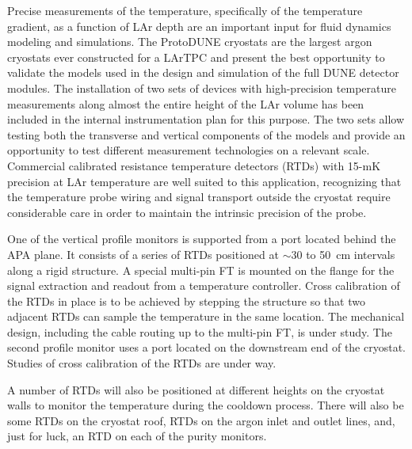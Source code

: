 	Precise %
	measurements of the temperature, specifically of the temperature gradient, %
	as a function of LAr depth are %
	an important input for fluid dynamics modeling and simulations.  The ProtoDUNE cryostats are the largest argon cryostats ever constructed for a LArTPC and present the best opportunity to validate the models used in the design and simulation of the full DUNE detector modules. The installation of two sets of devices with high-precision temperature measurements
	along almost the entire height of the LAr volume %
	has been included in the internal instrumentation plan for this purpose. The two sets allow testing both the transverse and vertical components of the models and provide an opportunity to test different measurement technologies on a relevant scale. 
	Commercial calibrated resistance temperature detectors (RTDs) with 15-mK precision at LAr temperature are well suited to this application, recognizing that the temperature probe wiring and signal transport outside the cryostat require considerable care in order to maintain %
	the intrinsic precision of the probe.
	
One of  %
the vertical profile monitors is supported from a port located behind the APA plane. It consists of a series of RTDs positioned at $\sim$30 to 50~cm intervals %
along a rigid structure. %
A special multi-pin FT is mounted on the flange %
for the signal extraction and readout from a temperature controller.  Cross calibration of the RTDs in place is to be achieved by stepping the structure so that two adjacent RTDs can sample the temperature in the same location.
The mechanical design, including the cable routing up to the multi-pin FT, is under study.
The second profile monitor uses a port located on the downstream end of the cryostat. Studies of cross calibration of the RTDs are under way. 

A number of RTDs will also be positioned at different heights %
on the cryostat walls to monitor the temperature %
during the %
cooldown process. There will also be some RTDs on the cryostat roof,  RTDs on the argon inlet and outlet lines, and, just for luck, an RTD on each of the purity monitors.


